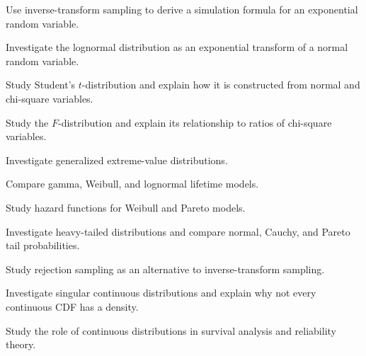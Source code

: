 \begin{exercise}[3]
Use inverse-transform sampling to derive a simulation formula for an
exponential random variable.
\end{exercise}

\begin{exercise}[4]
Investigate the lognormal distribution as an exponential transform of a
normal random variable.
\end{exercise}

\begin{exercise}[4]
Study Student's \(t\)-distribution and explain how it is constructed
from normal and chi-square variables.
\end{exercise}

\begin{exercise}[4]
Study the \(F\)-distribution and explain its relationship to ratios of
chi-square variables.
\end{exercise}

\begin{exercise}[4]
Investigate generalized extreme-value distributions.
\end{exercise}

\begin{exercise}[4]
Compare gamma, Weibull, and lognormal lifetime models.
\end{exercise}

\begin{exercise}[4]
Study hazard functions for Weibull and Pareto models.
\end{exercise}

\begin{exercise}[4]
Investigate heavy-tailed distributions and compare normal, Cauchy, and
Pareto tail probabilities.
\end{exercise}

\begin{exercise}[4]
Study rejection sampling as an alternative to inverse-transform
sampling.
\end{exercise}

\begin{exercise}[4]
Investigate singular continuous distributions and explain why not every
continuous CDF has a density.
\end{exercise}

\begin{exercise}[4]
Study the role of continuous distributions in survival analysis and
reliability theory.
\end{exercise}

